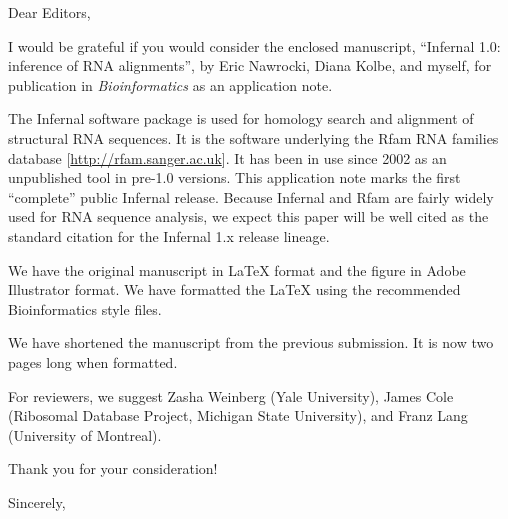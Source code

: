 \documentclass[11pt]{jfrcletter}
\begin{document}
\signature{Sean R. Eddy, Ph.D.}

%
\begin{letter}{}


%
\opening{Dear Editors,}

I would be grateful if you would consider the enclosed manuscript,
``Infernal 1.0: inference of RNA alignments'', by Eric Nawrocki, Diana
Kolbe, and myself, for publication in \emph{Bioinformatics} as an
application note.


The Infernal software package is used for homology search and
alignment of structural RNA sequences. It is the software underlying
the Rfam RNA families database [\url{http://rfam.sanger.ac.uk}].  It
has been in use since 2002 as an unpublished tool in pre-1.0
versions. This application note marks the first ``complete'' public
Infernal release. Because Infernal and Rfam are fairly widely used for
RNA sequence analysis, we expect this paper will be well cited as the
standard citation for the Infernal 1.x release lineage.

We have the original manuscript in LaTeX format and the figure in
Adobe Illustrator format. We have formatted the LaTeX using the
recommended Bioinformatics style files. 

We have shortened the manuscript from the previous submission. It is
now two pages long when formatted.

For reviewers, we suggest Zasha Weinberg (Yale University), James Cole
(Ribosomal Database Project, Michigan State University), and Franz
Lang (University of Montreal).

Thank you for your consideration!

\closing{Sincerely,}

\end{letter}
\end{document}
